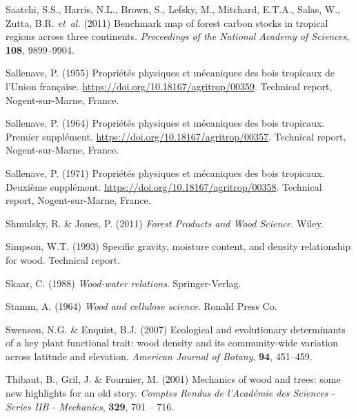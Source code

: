 \documentclass[a4paper, 12pt, leqno, dvipsnames]{article}\usepackage[]{graphicx}\usepackage[]{color}
\begin{document}
\begin{thebibliography}{50}
Saatchi, S.S., Harris, N.L., Brown, S., Lefsky, M., Mitchard, E.T.A., Salas,
  W., Zutta, B.R. \emph{et~al.} (2011) Benchmark map of forest carbon stocks in
  tropical regions across three continents.
\newblock \emph{Proceedings of the National Academy of Sciences}, \textbf{108},
  9899--9904.

Sallenave, P. (1955) {Propriétés physiques et mécaniques des bois tropicaux
  de l'Union française. \url{https://doi.org/10.18167/agritrop/00359}}.
\newblock Technical report, Nogent-sur-Marne, France.

Sallenave, P. (1964) {Propriétés physiques et mécaniques des bois tropicaux.
  Premier supplément. \url{https://doi.org/10.18167/agritrop/00357}}.
\newblock Technical report, Nogent-sur-Marne, France.

Sallenave, P. (1971) {Propriétés physiques et mécaniques des bois tropicaux.
  Deuxième supplément. \url{https://doi.org/10.18167/agritrop/00358}}.
\newblock Technical report, Nogent-sur-Marne, France.

Shmulsky, R. \& Jones, P. (2011) \emph{Forest Products and Wood Science}.
\newblock Wiley.

Simpson, W.T. (1993) Specific gravity, moisture content, and density
  relationship for wood.
\newblock Technical report.

Skaar, C. (1988) \emph{Wood-water relations}.
\newblock Springer-Verlag.

Stamm, A. (1964) \emph{Wood and cellulose science}.
\newblock Ronald Press Co.

Swenson, N.G. \& Enquist, B.J. (2007) Ecological and evolutionary determinants
  of a key plant functional trait: wood density and its community-wide
  variation across latitude and elevation.
\newblock \emph{American Journal of Botany}, \textbf{94}, 451--459.

Thibaut, B., Gril, J. \& Fournier, M. (2001) Mechanics of wood and trees: some
  new highlights for an old story.
\newblock \emph{Comptes Rendus de l'Académie des Sciences - Series IIB -
  Mechanics}, \textbf{329}, 701 -- 716.


\end{thebibliography}
\end{document}
